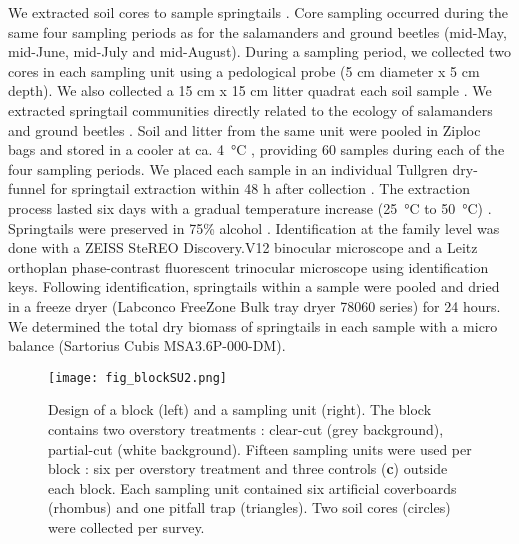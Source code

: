 We extracted soil cores to sample springtails \citep{pongeVerticalDistributionCollembola2000,salamonEffectsPlantDiversity2004,chauvatChangesSoilFaunal2011a,farskaManagementIntensityAffects2014}. 
Core sampling occurred during the same four sampling periods as for the salamanders and ground beetles (mid-May, mid-June, mid-July and mid-August). 
During a sampling period, we collected two cores in each sampling unit using a pedological probe (5 cm diameter x 5 cm depth). 
We also collected a 15 cm x 15 cm litter quadrat each soil sample \citep{raymond-leonardSpringtailCommunityStructure2018a,rousseauForestFloorMesofauna2018}.
We extracted springtail communities directly related to the ecology of salamanders and ground beetles \citep{edwardsAssessmentPopulationsSoilinhabiting1991,chauvatChangesSoilFaunal2011a,raymond-leonardSpringtailCommunityStructure2018a,rousseauForestFloorMesofauna2018}.
Soil and litter from the same unit were pooled in Ziploc\up{\texttrademark{}} bags and stored in a cooler at ca. 4 °C \citep{chauvatChangesSoilFaunal2011a,rousseauForestFloorMesofauna2018}, providing 60 samples during each of the four sampling periods.
We placed each sample in an individual Tullgren dry-funnel for springtail extraction within 48 h after collection \citep{rusekBiodiversityCollembolaTheir1998,wuCompositionSpatiotemporalVariation2014,rousseauForestFloorMesofauna2018}. 
The extraction process lasted six days with a gradual temperature increase (25 °C to 50 °C) \citep{raymond-leonardSpringtailCommunityStructure2018a}.
Springtails were preserved in 75\% alcohol \citep{wuCompositionSpatiotemporalVariation2014}.
Identification at the family level was done with a ZEISS SteREO Discovery.V12 binocular microscope and a Leitz orthoplan phase-contrast fluorescent trinocular microscope using \cite{bellingerChecklistCollembolaWorld1996} identification keys. 
Following identification, springtails within a sample were pooled and dried in a freeze dryer (Labconco FreeZone Bulk tray dryer 78060 series) for 24 hours. 
We determined the total dry biomass of springtails in each sample with a micro balance (Sartorius Cubis\up{\texttrademark{}} MSA3.6P-000-DM).

\pagebreak

\begin{figure}[ht]
	\centering
	\texttt{[image: fig\_blockSU2.png]}
	\caption[Design of one block and one sampling unit with three sampling methods.]{
  Design of a block (left) and a sampling unit (right). 
  The block contains two overstory treatments : clear-cut (grey background), partial-cut (white background). 
  Fifteen sampling units were used per block : six per overstory treatment and three controls (\textbf{c}) outside each block.
  Each sampling unit contained six artificial coverboards (rhombus) and one pitfall trap (triangles). Two soil cores (circles) were collected per survey.
  }
	\label{fig:blockSU}
	\end{figure}  

